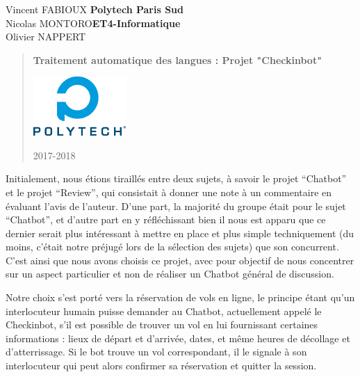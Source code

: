 \documentclass[]{article}
\begin{document}
\noindent
Vincent FABIOUX \hfill \textbf{Polytech Paris Sud}\\
\noindent
Nicolas MONTORO\hfill \textbf{ET4-Informatique}\\
\noindent
Olivier NAPPERT\hfill \\
	\vspace*{\fill} 
		\begin{quote} 
		\centering 
			\begin{center}\textbf{\huge{Traitement automatique des langues : Projet "Checkinbot"}}\end{center}
			\begin{center}\includegraphics[width=100pt]{polytech.jpg}\end{center}
			\bigskip
			\begin{center}\large{2017-2018}\end{center}
		\end{quote}
	\vspace*{\fill}

\newpage
\Huge{\textbf{\color{title}{Choix du Sujet}}}

\bigskip
\bigskip
\large{
Initialement, nous étions tiraillés entre deux sujets, à savoir le projet “Chatbot” et le projet “Review”, qui consistait à donner une note à un commentaire en évaluant l’avis de l’auteur. D’une part, la majorité du groupe était pour le sujet “Chatbot”, et d’autre part en y réfléchissant bien il nous est apparu que ce dernier serait plus intéressant à mettre en place et plus simple techniquement (du moins, c’était notre préjugé lors de la sélection des sujets) que son concurrent. C’est ainsi que nous avons choisis ce projet, avec pour objectif de nous concentrer sur un aspect particulier et non de réaliser un Chatbot général de discussion.

Notre choix s’est porté vers la réservation de vols en ligne, le principe étant qu’un interlocuteur humain puisse demander au Chatbot, actuellement appelé le Checkinbot, s’il est possible de trouver un vol en lui fournissant certaines informations : lieux de départ et d’arrivée, dates, et même heures de décollage et d'atterrissage. Si le bot trouve un vol correspondant, il le signale à son interlocuteur qui peut alors confirmer sa réservation et quitter la session.
}
\bigskip
\bigskip
\end{document}
